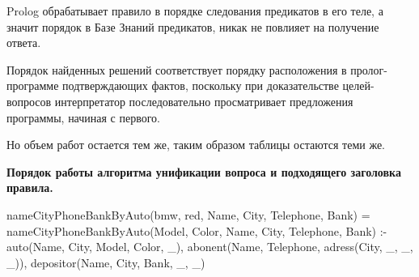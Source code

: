 \documentclass[a4paper,14pt]{extreport} %
\begin{document}
Prolog обрабатывает правило в порядке следования предикатов в его теле, а значит порядок в Базе Знаний предикатов, никак не повлияет на получение ответа. 

Порядок найденных решений соответствует порядку расположения в пролог-программе подтверждающих фактов, поскольку при доказательстве целей-вопросов интерпретатор последовательно просматривает предложения программы, начиная с первого.

Но объем работ остается тем же, таким образом таблицы остаются теми же. 

\newpage

\textbf{Порядок работы алгоритма унификации вопроса и подходящего заголовка правила. }

nameCityPhoneBankByAuto(bmw, red, Name, City, Telephone, Bank) = nameCityPhoneBankByAuto(Model, Color, Name, City, Telephone, Bank) :- auto(Name, City, Model, Color, \_), abonent(Name, Telephone, adress(City, \_, \_, \_)), depositor(Name, City, Bank, \_, \_)
\end{document}
